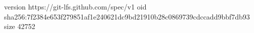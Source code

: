 version https://git-lfs.github.com/spec/v1
oid sha256:7f2384e653f279851af1e240621dc9bd21910b28c0869739cdccadd9bbf7db93
size 42752
